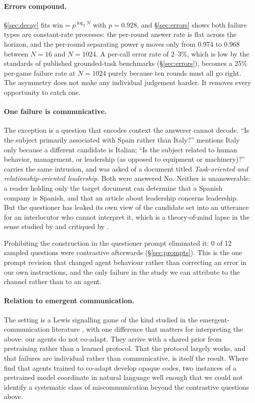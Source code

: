 \documentclass[11pt]{article}
\begin{document}
\paragraph{Errors compound.} \S\ref{sec:decay} fits
$\text{win}=p^{\log_2 N}$ with $p=0.928$, and \S\ref{sec:errors} shows both
failure types are constant-rate processes: the per-round answer rate is flat
across the horizon, and the per-round separating power $q$ moves only from 0.974
to 0.968 between $N{=}16$ and $N{=}1024$. A per-call error rate of 2--3\%, which
is low by the standards of published grounded-task benchmarks
(\S\ref{sec:errors}), becomes a 25\% per-game failure rate at $N{=}1024$ purely
because ten rounds must all go right. The asymmetry does not make any individual
judgement harder. It removes every opportunity to catch one.

\paragraph{One failure is communicative.} The exception is a question that
encodes context the answerer cannot decode. ``Is the subject primarily
associated with Spain rather than Italy?'' mentions Italy only because a
different candidate is Italian; ``Is the subject related to human behavior,
management, or leadership (as opposed to equipment or machinery)?'' carries the
same intrusion, and was asked of a document titled \emph{Task-oriented and
relationship-oriented leadership}. Both were answered No. Neither is
unanswerable: a reader holding only the target document can determine that a
Spanish company is Spanish, and that an article about leadership concerns
leadership. But the questioner has leaked its own view of the candidate set into
an utterance for an interlocutor who cannot interpret it, which is a
theory-of-mind lapse in the sense studied by \citet{kosinski2024} and critiqued
by \citet{ullman2023}.

Prohibiting the construction in the questioner prompt eliminated it: 0 of 12
sampled questions were contrastive afterwards (\S\ref{sec:prompts}). This is the
one prompt revision that changed agent behaviour rather than correcting an error
in our own instructions, and the only failure in the study we can attribute to
the channel rather than to an agent.

\paragraph{Relation to emergent communication.} The setting is a Lewis
signalling game \citep{lewis1969} of the kind studied in the
emergent-communication literature \citep{foerster2016,lazaridou2020}, with one
difference that matters for interpreting the above: our agents do not co-adapt.
They arrive with a shared prior from pretraining rather than a learned protocol.
That the protocol largely works, and that failures are individual rather than
communicative, is itself the result. Where \citet{kottur2017} find that agents
trained to co-adapt develop opaque codes, two instances of a pretrained model
coordinate in natural language well enough that we could not identify a
systematic class of miscommunication beyond the contrastive questions above.
\end{document}
